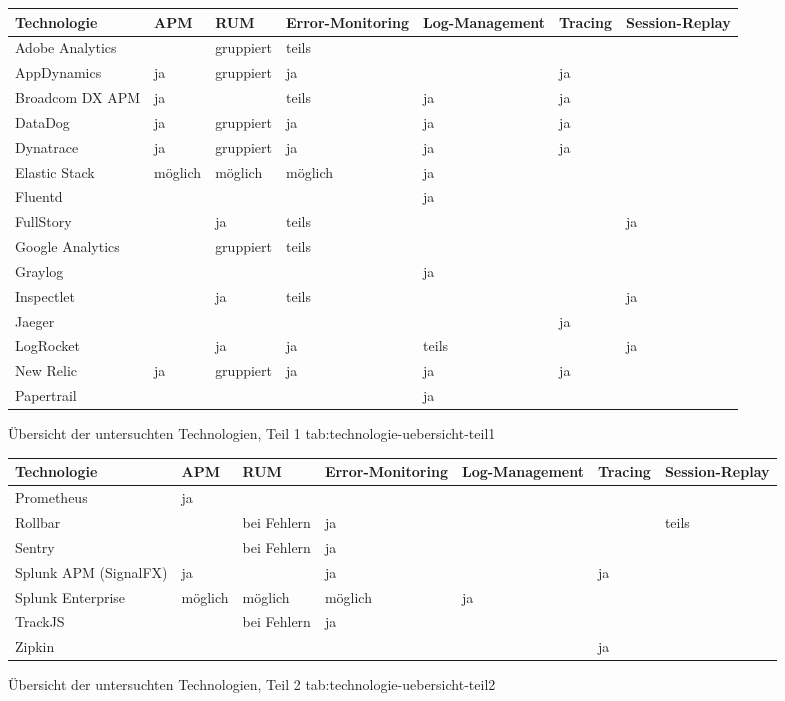 %
{
\begin{tabular}{|p{2.25cm}|p{1.5cm}|p{2.0cm}|p{3.0cm}|p{3.0cm}|p{1.5cm}|p{2.5cm}|}
\hline
Technologie & APM & RUM & Error-Mo\-ni\-tor\-ing & Log-Management & Tracing & Session-Replay \\
\hline
Adobe Analytics &  & gruppiert & teils &  &  &  \\
\hline
AppDynamics & ja & gruppiert & ja &  & ja &  \\
\hline
Broadcom DX APM & ja &  & teils & ja & ja &  \\
\hline
DataDog & ja & gruppiert & ja & ja & ja &  \\
\hline
Dynatrace & ja & gruppiert & ja & ja & ja &  \\
\hline
Elastic Stack & möglich & möglich & möglich & ja &  &  \\
\hline
Fluentd &  &  &  & ja &  &  \\
\hline
FullStory &  & ja & teils &  &  & ja \\
\hline
Google Analytics &  & gruppiert & teils &  &  &  \\
\hline
Graylog &  &  &  & ja &  &  \\
\hline
Inspectlet &  & ja & teils &  &  & ja \\
\hline
Jaeger &  &  &  &  & ja &  \\
\hline
LogRocket &  & ja & ja & teils &  & ja \\
\hline
New Relic & ja & gruppiert & ja & ja & ja &  \\
\hline
Papertrail &  &  &  & ja &  &  \\
\hline
\end{tabular}
}
{Übersicht der untersuchten Technologien, Teil 1}
{tab:technologie-uebersicht-teil1}

%
{
\begin{tabular}{|p{2.25cm}|p{1.5cm}|p{2.0cm}|p{3.0cm}|p{3.0cm}|p{1.5cm}|p{2.5cm}|}
\hline
Technologie & APM & RUM & Error-Mo\-ni\-tor\-ing & Log-Management & Tracing & Session-Replay \\
\hline
Prometheus & ja &  &  &  &  &  \\
\hline
Rollbar &  & bei \mbox{Fehlern} & ja &  &  & teils \\
\hline
Sentry &  & bei \mbox{Fehlern} & ja &  &  &  \\
\hline
Splunk APM (SignalFX) & ja &  & ja &  & ja &  \\
\hline
Splunk \mbox{Enterprise} & möglich & möglich & möglich & ja &  &  \\
\hline
TrackJS &  & bei \mbox{Fehlern} & ja &  &  &  \\
\hline
Zipkin &  &  &  &  & ja &  \\
\hline
\end{tabular}
}
{Übersicht der untersuchten Technologien, Teil 2}
{tab:technologie-uebersicht-teil2}